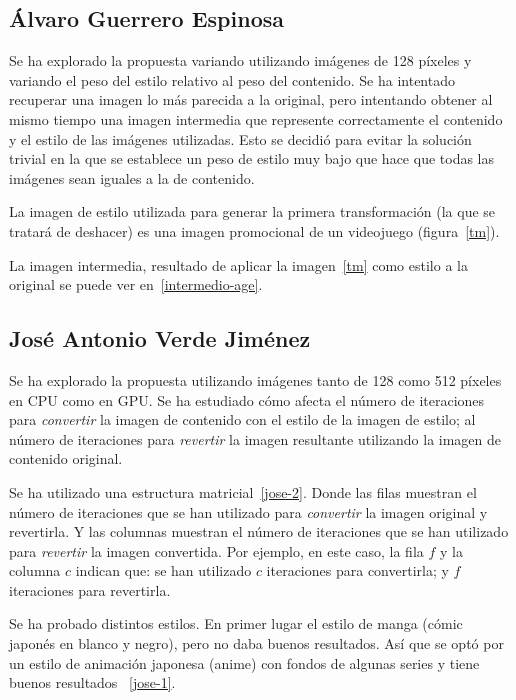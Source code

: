 \documentclass[es]{uc3mreport}
\begin{document}
\begin{report}
            \subsection{Álvaro Guerrero Espinosa}
            Se ha explorado la propuesta variando utilizando imágenes de 128
            píxeles y variando el peso del estilo relativo al peso del
            contenido. Se ha intentado recuperar una imagen lo más parecida a la
            original, pero intentando obtener al mismo tiempo una imagen intermedia
            que represente correctamente el contenido y el estilo de las imágenes
            utilizadas. Esto se decidió para evitar la solución trivial en la que se
            establece un peso de estilo muy bajo que hace que todas las imágenes
            sean iguales a la de contenido.

            La imagen de estilo utilizada para generar la primera
            transformación (la que se tratará de deshacer) es una imagen
            promocional de un videojuego (figura~\ref{tm}).

            La imagen intermedia, resultado de aplicar la
            imagen~\ref{tm} como estilo a la original se puede ver
            en~\ref{intermedio-age}.

            \subsection{José Antonio Verde Jiménez}
            Se ha explorado la propuesta utilizando imágenes tanto de 128 como
            512 píxeles en CPU como en GPU. Se ha estudiado cómo afecta el
            número de iteraciones para \textit{convertir} la imagen de
            contenido con el estilo de la imagen de estilo; al número de
            iteraciones para \textit{revertir} la imagen resultante utilizando
            la imagen de contenido original.

            Se ha utilizado una estructura matricial~\ref{jose-2}. Donde las filas muestran
            el número de iteraciones que se han utilizado para
            \textit{convertir} la imagen original y revertirla. Y las columnas
            muestran el número de iteraciones que se han utilizado para
            \textit{revertir} la imagen convertida. Por ejemplo, en este caso,
            la fila $f$ y la columna $c$ indican que: se han utilizado $c$
            iteraciones para convertirla; y $f$ iteraciones para revertirla.

            Se ha probado distintos estilos. En primer lugar el estilo de manga
            (cómic japonés en blanco y negro), pero no daba buenos resultados.
            Así que se optó por un estilo de animación japonesa (anime) con
            fondos de algunas series y tiene buenos resultados ~\ref{jose-1}.



\end{report}
\end{document}
